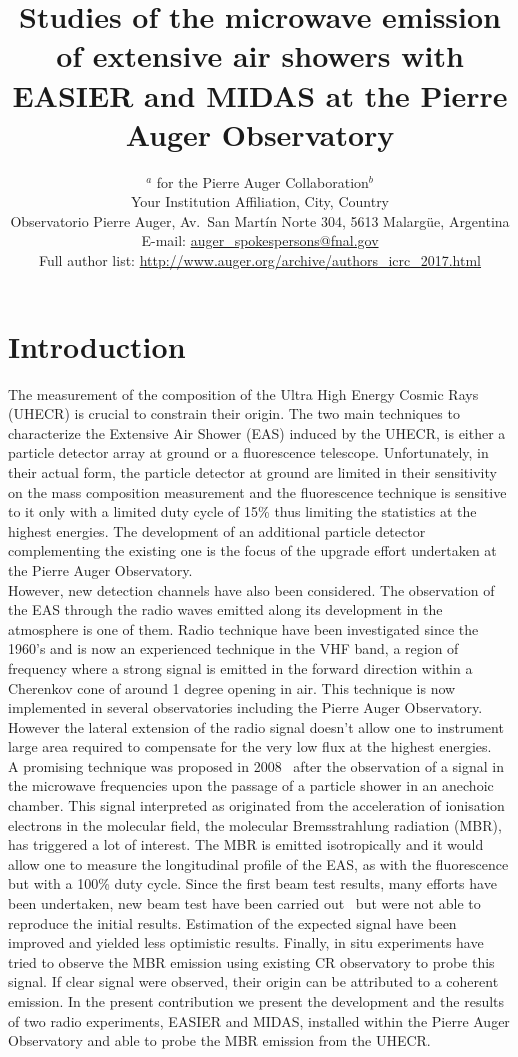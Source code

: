 \documentclass{PoS}
\title{Studies of the microwave emission of extensive air showers with EASIER and MIDAS at the Pierre Auger Observatory}
\author{\speaker{Romain Ga\"{i}or}$^a$ for the Pierre Auger Collaboration$^b$\\
\llap{$^a$}Your Institution Affiliation, City, Country\\
\llap{$^b$}Observatorio Pierre Auger, Av.\ San Mart\'in Norte 304, 5613 Malarg\"ue, Argentina\\
E-mail: \href{mailto:auger_spokespersons@fnal.gov}{\rm auger\_spokespersons@fnal.gov}\\
Full author list: \href{http://www.auger.org/archive/authors_icrc_2017.html}{\rm http://www.auger.org/archive/authors\_icrc\_2017.html}}
\begin{document}
\section{Introduction}
The measurement of the composition of the Ultra High Energy Cosmic Rays (UHECR) is crucial to constrain their origin. The two main techniques to characterize the Extensive Air Shower (EAS) induced by the UHECR, is either a particle detector array at ground or a fluorescence telescope. Unfortunately, in their actual form, the particle detector at ground are limited in their sensitivity on the mass composition measurement and the fluorescence technique is sensitive to it only with a limited duty cycle of 15\% thus limiting the statistics at the highest energies. The development of 
an additional particle detector complementing the existing one is the focus of the upgrade effort undertaken at the Pierre Auger Observatory\cite{augerupgrade}.\\However, new detection channels have also been considered. The observation of the EAS through the radio waves emitted along its development in the atmosphere is one of them. Radio technique have been investigated since the 1960's and is now an experienced technique in the VHF band, a region of frequency where a strong signal is emitted in the forward direction within a Cherenkov cone of around 1 degree opening in air. This technique is now implemented in several observatories including the Pierre Auger Observatory\cite{VHF}. However the lateral extension of the radio signal doesn't allow one to instrument large area required to compensate for the very low flux at the highest energies.\\ A promising technique was proposed in 2008~\cite{gorham} after the observation of a signal in the microwave frequencies upon the passage of a particle shower in an anechoic chamber. This signal interpreted as originated from the acceleration of ionisation electrons in the molecular field, the molecular Bremsstrahlung radiation (MBR), has triggered a lot of interest. The MBR is emitted isotropically and it would allow one to measure the longitudinal profile of the EAS, as with the fluorescence but with a 100\% duty cycle. Since the first beam test results, many efforts have been undertaken, new beam test have been carried out~\cite{amy, maybe} but were not able to reproduce the initial results. Estimation of the expected signal have been improved and yielded less optimistic results\cite{mbr2016}. Finally, in situ experiments have tried to observe the MBR emission using existing CR observatory to probe this signal\cite{crome, icrc2013}. If clear signal were observed, their origin can be attributed to a coherent emission. In the present contribution we present the development and the results of two radio experiments, EASIER and MIDAS, installed within the Pierre Auger Observatory and able to probe the MBR emission from the UHECR.
\newpage
\end{document}

